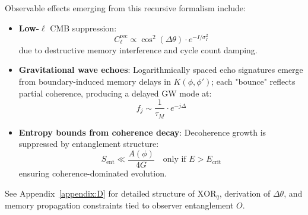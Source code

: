 Observable effects emerging from this recursive formalism include:
\begin{itemize}
  \item \textbf{Low-\( \ell \)} CMB suppression:
  \[
    C_\ell^{\text{rec}} \propto \cos^2(\Delta \theta) \cdot e^{-I/\sigma_I^2}
  \]
  due to destructive memory interference and cycle count damping.

  \item \textbf{Gravitational wave echoes}:
  Logarithmically spaced echo signatures emerge from boundary-induced memory delays in \( K(\phi, \phi') \); each "bounce" reflects partial coherence, producing a delayed GW mode at:
  \[
    f_j \sim \frac{1}{\tau_M} \cdot e^{-j \Delta}
  \]

  \item \textbf{Entropy bounds from coherence decay}:
  Decoherence growth is suppressed by entanglement structure:
  \[
    S_{\text{ent}} \ll \frac{A(\phi)}{4G} \quad \text{only if } E > E_{\text{crit}}
  \]
  ensuring coherence-dominated evolution.
\end{itemize}

See Appendix~\ref{appendix:D} for detailed structure of \( \text{XOR}_q \), derivation of \( \Delta \theta \), and memory propagation constraints tied to observer entanglement \( O \).
